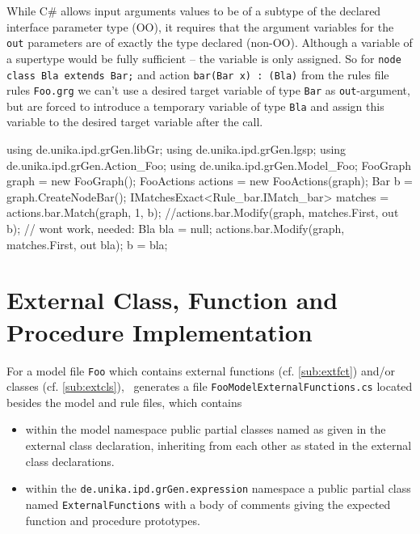 \begin{warning}
While C\# allows input arguments values to be of a subtype of the declared interface parameter type (OO), 
it requires that the argument variables for the \texttt{out} parameters are of exactly the type declared (non-OO).
Although a variable of a supertype would be fully sufficient -- the variable is only assigned.
So for \texttt{node class Bla extends Bar;} and action \texttt{bar(Bar x) : (Bla)} from the rules file rules \texttt{Foo.grg}
we can't use a desired target variable of type \texttt{Bar} as \texttt{out}-argument,
but are forced to introduce a temporary variable of type \texttt{Bla}
and assign this variable to the desired target variable after the call.
\begin{csharplet}
using de.unika.ipd.grGen.libGr;
using de.unika.ipd.grGen.lgsp;
using de.unika.ipd.grGen.Action_Foo;
using de.unika.ipd.grGen.Model_Foo;
FooGraph graph = new FooGraph();
FooActions actions = new FooActions(graph);
Bar b = graph.CreateNodeBar();
IMatchesExact<Rule_bar.IMatch_bar> matches = actions.bar.Match(graph, 1, b);
//actions.bar.Modify(graph, matches.First, out b); // wont work, needed:
Bla bla = null; 
actions.bar.Modify(graph, matches.First, out bla);
b = bla;
\end{csharplet}
\end{warning}


\section{External Class, Function and Procedure Implementation}\label{sub:extclsfctimpl}

For a model file \texttt{Foo} which contains external functions (cf. \ref{sub:extfct}) and/or classes (cf. \ref{sub:extcls}), \GrG~generates a file \texttt{FooModelExternalFunctions.cs} located besides the model and rule files, which contains
\begin{itemize}
	\item within the model namespace public partial classes named as given in the external class declaration,
inheriting from each other as stated in the external class declarations.
	\item within the \texttt{de.unika.ipd.grGen.expression} namespace a public partial class named \texttt{ExternalFunctions} with a body of comments giving the expected function and procedure prototypes.
\end{itemize}

